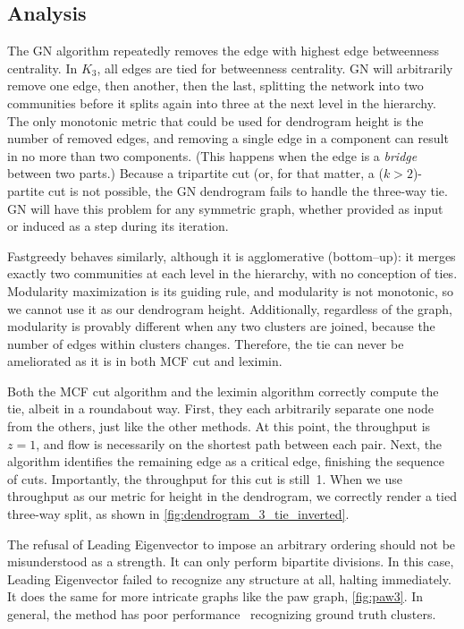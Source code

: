 \subsection{Analysis}

The GN algorithm repeatedly removes the edge with highest edge betweenness centrality. In $K_3$, all edges are tied for betweenness centrality. GN will arbitrarily remove one edge, then another, then the last, splitting the network into two communities before it splits again into three at the next level in the hierarchy. The only monotonic metric that could be used for dendrogram height is the number of removed edges, and removing a single edge in a component can result in no more than two components. (This happens when the edge is a \emph{bridge}~\cite{west2001introduction} between two parts.) Because a tripartite cut (or, for that matter, a ($k > 2$)-partite cut is not possible, the GN dendrogram fails to handle the three-way tie. GN will have this problem for any symmetric graph, whether provided as input or induced as a step during its iteration.

Fastgreedy behaves similarly, although it is agglomerative (bottom--up): it merges exactly two communities at each level in the hierarchy, with no conception of ties. Modularity maximization is its guiding rule, and modularity is not monotonic, so we cannot use it as our dendrogram height. Additionally, regardless of the graph, modularity is provably different when any two clusters are joined, because the number of edges within clusters changes. Therefore, the tie can never be ameliorated as it is in both MCF cut and leximin.

Both the MCF cut algorithm and the leximin algorithm correctly compute the tie, albeit in a roundabout way. First, they each arbitrarily separate one node from the others, just like the other methods. At this point, the throughput is~$z=1$, and flow is necessarily on the shortest path between each pair. Next, the algorithm identifies the remaining edge as a critical edge, finishing the sequence of cuts. Importantly, the throughput for this cut is still~1. When we use throughput as our metric for height in the dendrogram, we correctly render a tied three-way split, as shown in \autoref{fig:dendrogram_3_tie_inverted}.

The refusal of Leading Eigenvector to impose an arbitrary ordering should not be misunderstood as a strength. It can only perform bipartite divisions. In this case, Leading Eigenvector failed to recognize any structure at all, halting immediately. It does the same for more intricate graphs like the paw graph, \autoref{fig:paw3}. In general, the method has poor performance~\cite{costa2007characterization} recognizing ground truth clusters.




